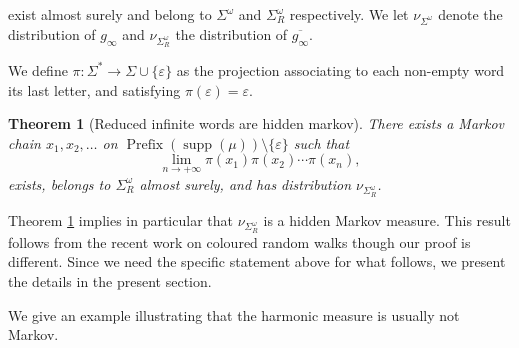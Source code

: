 \documentclass{article}
\newtheorem{theorem}{Theorem}
\DeclareMathOperator{\supp}{supp}
\DeclareMathOperator{\prefix}{Prefix}
\begin{document}
exist almost surely and belong to \(\Sigma^\omega\) and \(\Sigma^\omega_R\) respectively.   We let \(\nu_{\Sigma^{\omega}}\) denote the distribution of \(g_\infty\) and \(\nu_{\Sigma^\omega_{R}}\) the distribution of \(\overline{g_\infty}\).

We define \(\pi:\Sigma^* \to \Sigma \cup \lbrace \varepsilon \rbrace\) as the projection associating to each non-empty word its last letter, and satisfying \(\pi(\varepsilon) = \varepsilon\).

\begin{theorem}[Reduced infinite words are hidden markov]\label{reducedhiddenmarkovtheorem}
  There exists a Markov chain \(x_1,x_2,\ldots\) on \(\prefix(\supp(\mu)) \setminus \lbrace \varepsilon\rbrace\) such that
 \[\lim\limits_{n \to +\infty}\pi(x_1)\pi(x_2)\cdots \pi(x_n),\]
 exists, belongs to \(\Sigma^\omega_R\) almost surely, and has distribution \(\nu_{\Sigma^\omega_R}\).
\end{theorem}

Theorem \ref{reducedhiddenmarkovtheorem} implies in particular that \(\nu_{\Sigma^\omega_R}\) is a hidden Markov measure.  This result follows from the recent work on coloured random walks \cite{bordenave-dubail} though our proof is different.   Since we need the specific statement above for what follows, we present the details in the present section.

We give an example illustrating that the harmonic measure is usually not Markov.
\end{document}
